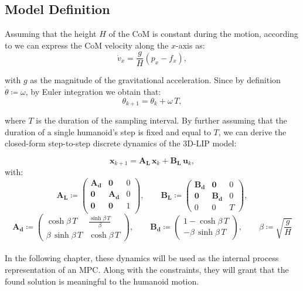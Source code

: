\documentclass[main.tex]{subfiles}
\begin{document}
\subsection{Model Definition}
Assuming that the height $H$ of the CoM is constant during the motion, according to \cite{peng_main_paper} we can express the CoM velocity along the $x$-axis as:
$$
\dot{v}_x = \frac{g}{H}\left(p_x - f_x\right),
$$

with $g$ as the magnitude of the gravitational acceleration. Since by definition $\dot{\theta} \coloneqq \omega$, by Euler integration we obtain that:
$$
\theta_{k+1} = \theta_k + \omega \, T,
$$

where $T$ is the duration of the sampling interval. By further assuming that the duration of a single humanoid's step is fixed and equal to $T$, we can derive the closed-form step-to-step discrete dynamics of the 3D-LIP model:

$$
\mathbf{x}_{k+1} = \mathbf{A_L} \, \mathbf{x}_k + \mathbf{B_L} \, \mathbf{u}_k,
$$
with:
$$
\mathbf{A_L} \coloneqq 
\begin{pmatrix}
\mathbf{A_d} & \mathbf{0} & 0 \\
\mathbf{0} & \mathbf{A_d} & 0 \\
\mathbf{0} & \mathbf{0} & 1 \\
\end{pmatrix}, \qquad
\mathbf{B_L} \coloneqq 
\begin{pmatrix}
\mathbf{B_d} & \mathbf{0} & 0 \\
\mathbf{0} & \mathbf{B_d} & 0 \\
0 & 0 & T
\end{pmatrix},
$$
$$
\mathbf{A_d} \coloneqq 
\begin{pmatrix}
\cosh{\beta \, T} & \frac{\sinh{\beta \, T}}{\beta}  \\
\beta \, \sinh{\beta \, T} & \cosh{\beta \, T}
\end{pmatrix}, \qquad
\mathbf{B_d} \coloneqq 
\begin{pmatrix}
1 - \cosh{\beta \, T} \\
-\beta \, \sinh{\beta \, T}
\end{pmatrix}, \qquad
\beta \coloneqq \sqrt{\frac{g}{H}}
$$
\\
In the following chapter, these dynamics will be used as the internal process representation of an MPC. Along with the constraints, they will grant that the found solution is meaningful to the humanoid motion.
\end{document}
